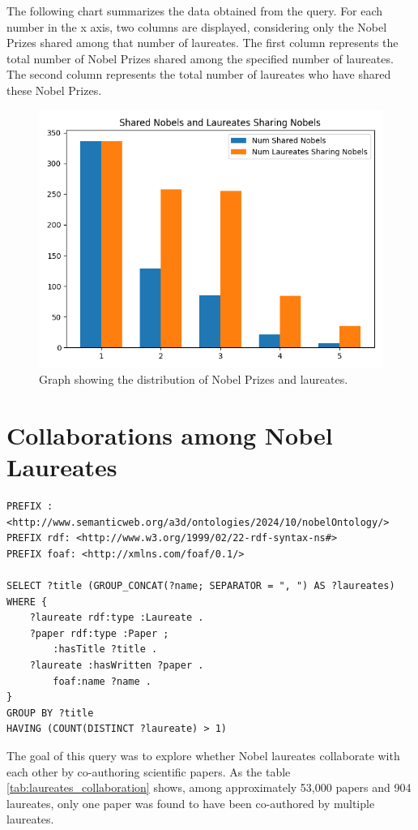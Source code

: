 \documentclass{article}
\begin{document}
\noindent The following chart summarizes the data obtained from the query. For each number in the x axis, two columns are displayed, considering
only the Nobel Prizes shared among that number of laureates.
The first column represents the total number of Nobel Prizes shared among the specified number of laureates.
The second column represents the total number of laureates who have shared these Nobel Prizes.
\begin{figure}[H]
	\centering
	\includegraphics[width=0.7\linewidth]{../queries/plots/prizeShare.png}
	\caption{Graph showing the distribution of Nobel Prizes and laureates.}
	\label{fig:prizeShare}
\end{figure}

\section{Collaborations among Nobel Laureates}

\begin{lstlisting}
PREFIX : <http://www.semanticweb.org/a3d/ontologies/2024/10/nobelOntology/>
PREFIX rdf: <http://www.w3.org/1999/02/22-rdf-syntax-ns#>
PREFIX foaf: <http://xmlns.com/foaf/0.1/>

SELECT ?title (GROUP_CONCAT(?name; SEPARATOR = ", ") AS ?laureates) WHERE {
    ?laureate rdf:type :Laureate .
    ?paper rdf:type :Paper ;
        :hasTitle ?title .
    ?laureate :hasWritten ?paper .
        foaf:name ?name .
}
GROUP BY ?title
HAVING (COUNT(DISTINCT ?laureate) > 1)
\end{lstlisting}

\vspace{1em}

The goal of this query was to explore whether Nobel laureates collaborate with each other by co-authoring
scientific papers. As the table \ref{tab:laureates_collaboration} shows, among approximately 53,000 papers
and 904 laureates, only one paper was found to have been co-authored by multiple laureates.
\end{document}

